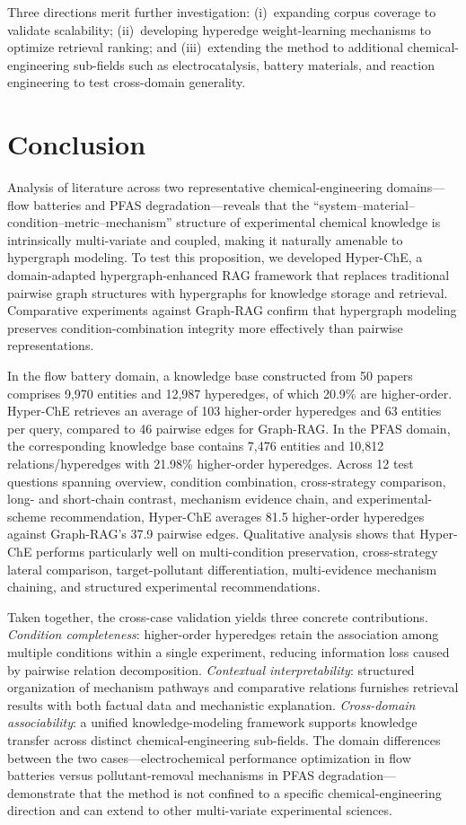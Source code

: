 \documentclass[11pt,a4paper]{article}
\begin{document}
Three directions merit further investigation: (i)~expanding corpus coverage to validate scalability; (ii)~developing hyperedge weight-learning mechanisms to optimize retrieval ranking; and (iii)~extending the method to additional chemical-engineering sub-fields such as electrocatalysis, battery materials, and reaction engineering to test cross-domain generality.

\section{Conclusion}
\label{sec:conclusion}

Analysis of literature across two representative chemical-engineering domains---flow batteries and PFAS degradation---reveals that the ``system--material--condition--metric--mechanism'' structure of experimental chemical knowledge is intrinsically multi-variate and coupled, making it naturally amenable to hypergraph modeling. To test this proposition, we developed Hyper-ChE, a domain-adapted hypergraph-enhanced RAG framework that replaces traditional pairwise graph structures with hypergraphs for knowledge storage and retrieval. Comparative experiments against Graph-RAG confirm that hypergraph modeling preserves condition-combination integrity more effectively than pairwise representations.

In the flow battery domain, a knowledge base constructed from 50 papers comprises 9,970 entities and 12,987 hyperedges, of which 20.9\% are higher-order. Hyper-ChE retrieves an average of 103 higher-order hyperedges and 63 entities per query, compared to 46 pairwise edges for Graph-RAG. In the PFAS domain, the corresponding knowledge base contains 7,476 entities and 10,812 relations/hyperedges with 21.98\% higher-order hyperedges. Across 12 test questions spanning overview, condition combination, cross-strategy comparison, long- and short-chain contrast, mechanism evidence chain, and experimental-scheme recommendation, Hyper-ChE averages 81.5 higher-order hyperedges against Graph-RAG's 37.9 pairwise edges. Qualitative analysis shows that Hyper-ChE performs particularly well on multi-condition preservation, cross-strategy lateral comparison, target-pollutant differentiation, multi-evidence mechanism chaining, and structured experimental recommendations.

Taken together, the cross-case validation yields three concrete contributions. \emph{Condition completeness}: higher-order hyperedges retain the association among multiple conditions within a single experiment, reducing information loss caused by pairwise relation decomposition. \emph{Contextual interpretability}: structured organization of mechanism pathways and comparative relations furnishes retrieval results with both factual data and mechanistic explanation. \emph{Cross-domain associability}: a unified knowledge-modeling framework supports knowledge transfer across distinct chemical-engineering sub-fields. The domain differences between the two cases---electrochemical performance optimization in flow batteries versus pollutant-removal mechanisms in PFAS degradation---demonstrate that the method is not confined to a specific chemical-engineering direction and can extend to other multi-variate experimental sciences.
\end{document}
